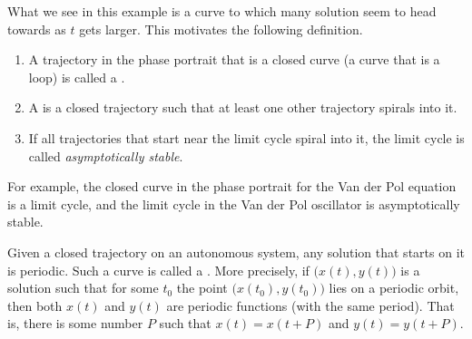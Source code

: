 What we see in this example is a curve to which many solution seem to head towards as $t$ gets larger. This motivates the following definition.

\begin{definition}
\begin{enumerate}[1.]
\item A trajectory in the phase portrait that is a closed 
curve (a curve that is a loop) is called a 
\emph{}.

\item A \emph{}
is a closed trajectory such
that at least one other trajectory spirals into it.
\item If all trajectories that start near the limit cycle spiral into it, the
limit cycle is called
\emph{asymptotically stable}.
\end{enumerate}
\end{definition}
For example, the closed curve in the phase portrait for the Van der Pol
equation is a limit cycle, and the limit cycle in the Van der Pol oscillator is 
asymptotically stable.

%

Given a closed trajectory on an autonomous system,
any solution that starts on it is periodic.
Such a curve is called a
\emph{}.
More precisely, if
$\bigl(x(t),y(t)\bigr)$
is a solution such that for some $t_0$ the point
$\bigl(x(t_0),y(t_0)\bigr)$ lies on a periodic orbit, then both $x(t)$ and $y(t)$
are periodic functions (with the same period).  That is, there is some
number $P$ such that $x(t) = x(t+P)$ and $y(t) = y(t+P)$.

